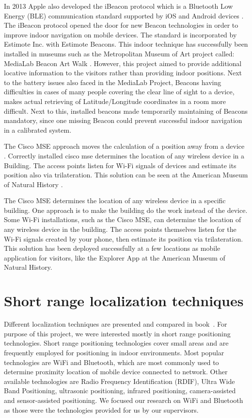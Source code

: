In 2013 Apple also developed the iBeacon protocol which is a Bluetooth Low Energy (BLE) communication standard supported by iOS and Android devices \cite{appleIBeacon}. The iBeacon protocol opened the door for new Beacon technologies in order to improve indoor navigation on mobile devices. The standard is incorporated by Estimote Inc. with Estimote Beacons. This indoor technique has successfully been installed in museums such as the Metropolitan Museum of Art project called: MediaLab Beacon Art Walk \cite{MuseumArt}. However, this project aimed to provide additional locative information to the visitors rather than providing indoor positions. Next to the battery issues also faced in the MediaLab Project, Beacons having difficulties  in cases of many people covering the clear line of sight to a device, makes actual retrieving of Latitude/Longitude coordinates in a room more difficult. Next to this, installed beacons made  temporarily maintaining of Beacons mandatory, since one missing Beacon could prevent successful indoor navigation in a calibrated system.

The Cisco MSE approach moves the calculation of a position away from a device \cite{oreilly11}. Correctly installed cisco mse determines the location of any wireless device in a Building. The access points listen for Wi-Fi signals of devices and estimate its position also via trilateration. This solution can be seen at the American Museum of Natural History \cite{AMNH15}.

The Cisco MSE determines the location of any wireless device in a specific building. One approach is to make the building do the work instead of the device. Some Wi-Fi installations, such as the Cisco MSE, can determine the location of any wireless device in the building. The access points themselves listen for the Wi-Fi signals created by your phone, then estimate its position via trilateration. This solution has been deployed successfully at a few locations as mobile application for visitors, like the Explorer App  at the American Museum of Natural History.


\vspace{0.5cm}

\section{Short range localization techniques}

Different localization techniques are presented and compared in book~\cite{brimicombe2009location}. For purpose of this project, we were interested mostly in short range positioning technologies. Short range positioning technologies cover small areas and are frequently employed for positioning in indoor environments. Most popular technologies are WiFi and Bluetooth, which are most commonly used to determine proximity location of mobile device connected to network. Other available technologies are Radio Frequency Identification (RDIF), Ultra Wide Band Positioning, ultrasonic positioning, infrared positioning, camera-assisted and sensor-assisted positioning. We focused our research on WiFi and Bluetooth as those were the technologies provided for us by our supervisors.

